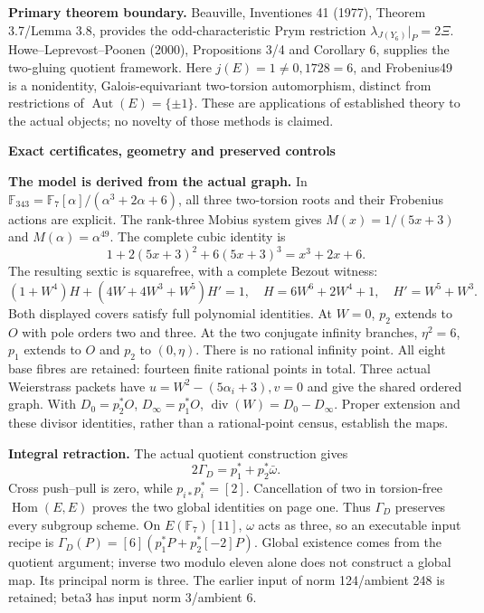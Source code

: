 \documentclass[10pt,a4paper]{article}
\begin{document}
\textbf{Primary theorem boundary.} Beauville, Inventiones 41 (1977),
Theorem 3.7/Lemma 3.8, provides the odd-characteristic Prym restriction
$\lambda_{J(Y_6)}|_P=2\Xi$. Howe--Leprevost--Poonen (2000),
Propositions 3/4 and Corollary 6, supplies the two-gluing quotient
framework. Here $j(E)=1\ne0,1728=6$, and Frobenius49 is a nonidentity,
Galois-equivariant two-torsion automorphism, distinct from restrictions
of $\operatorname{Aut}(E)=\{\pm1\}$. These are applications of established
theory to the actual objects; no novelty of those methods is claimed.

\newpage
{\Large\bfseries Exact certificates, geometry and preserved controls}\par

\textbf{The model is derived from the actual graph.} In
$\mathbb F_{343}=\mathbb F_7[\alpha]/(\alpha^3+2\alpha+6)$, all three
two-torsion roots and their Frobenius actions are explicit. The rank-three
Mobius system gives $M(x)=1/(5x+3)$ and $M(\alpha)=\alpha^{49}$.
The complete cubic identity is
\[
1+2(5x+3)^2+6(5x+3)^3=x^3+2x+6.
\]
The resulting sextic is squarefree, with a complete Bezout witness:
\[
(1+W^4)H+(4W+4W^3+W^5)H'=1,\quad
H=6W^6+2W^4+1,\quad H'=W^5+W^3.
\]
Both displayed covers satisfy full polynomial identities. At $W=0$,
$p_2$ extends to $O$ with pole orders two and three. At the two conjugate
infinity branches, $\eta^2=6$, $p_1$ extends to $O$ and $p_2$ to
$(0,\eta)$. There is no rational infinity point. All eight base fibres
are retained: fourteen finite rational points in total. Three actual
Weierstrass packets have $u=W^2-(5\alpha_i+3),v=0$ and give the shared
ordered graph. With $D_0=p_2^*O$, $D_\infty=p_1^*O$,
$\operatorname{div}(W)=D_0-D_\infty$. Proper extension and these divisor
identities, rather than a rational-point census, establish the maps.

\textbf{Integral retraction.} The actual quotient construction gives
\[
2\Gamma_D=p_1^*+p_2^*\bar\omega.
\]
Cross push--pull is zero, while $p_{i*}p_i^*=[2]$. Cancellation of
two in torsion-free $\operatorname{Hom}(E,E)$ proves the two global
identities on page one. Thus $\Gamma_D$ preserves every subgroup scheme.
On $E(\mathbb F_7)[11]$, $\omega$ acts as three, so an executable input
recipe is $\Gamma_D(P)=[6](p_1^*P+p_2^*[-2]P)$. Global existence comes
from the quotient argument; inverse two modulo eleven alone does not
construct a global map. Its principal norm is three. The earlier input
of norm 124/ambient 248 is retained; beta3 has input norm 3/ambient 6.
\end{document}
